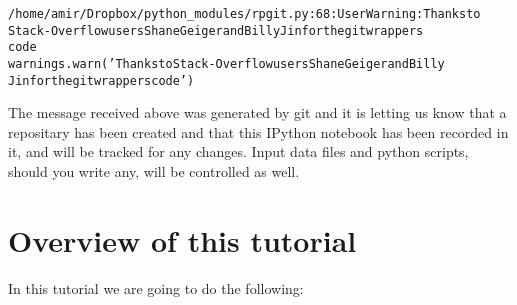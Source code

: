 \documentclass[letterpaper,10pt,english]{/usr/share/sphinx/texinputs/sphinxhowto}
\newenvironment{InvisibleVerbatim}
        {\begin{mdframed}[leftmargin=0.1\linewidth,innerleftmargin=3pt,innerrightmargin=3pt, userdefinedwidth=1\linewidth, linewidth=0pt, linecolor=white, usetwoside=false]}
        {\end{mdframed}}
\begin{document}
                \begin{InvisibleVerbatim}
                \vspace{-0.5\baselineskip}
\begin{alltt}/home/amir/Dropbox/python\_modules/rpgit.py:68: UserWarning: Thanks to
Stack-Overflow users Shane Geiger and Billy Jin for the git wrappers
code
  warnings.warn('Thanks to Stack-Overflow users Shane Geiger and Billy
Jin for the git wrappers code')
\end{alltt}

            \end{InvisibleVerbatim}
            
        
    
The message received above was generated by git and it is letting us
know that a repositary has been created and that this IPython notebook
has been recorded in it, and will be tracked for any changes. Input data
files and python scripts, should you write any, will be controlled as
well.\section{Overview of this tutorial}\label{overview-of-this-tutorial}

In this tutorial we are going to do the following:
\end{document}
